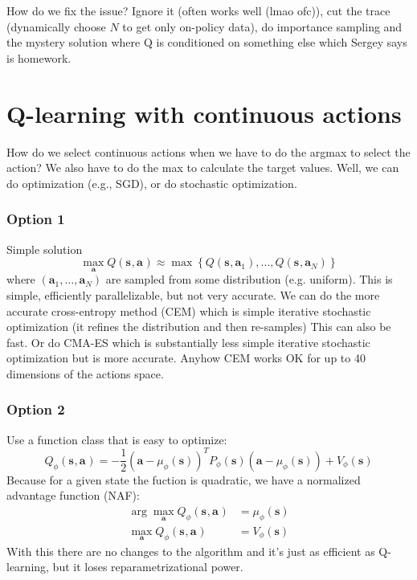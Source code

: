 \documentclass{report}
\newcommand{\argmax}{\arg\!\max}
\begin{document}
How do we fix the issue?
Ignore it (often works well (lmao ofc)), cut the trace (dynamically choose $N$ to get only on-policy data),
do importance sampling and the mystery solution where Q is conditioned on something else which Sergey says is homework.

\section{Q-learning with continuous actions}
How do we select continuous actions when we have to do the argmax to select the action?
We also have to do the max to calculate the target values.
Well, we can do optimization (e.g., SGD), or do stochastic optimization.
\subsubsection{Option 1}
Simple solution
\begin{equation}
		\max_{\bm{a}} Q(\bm{s}_{}, \bm{a}_{}) \approx \max \left\{ Q(\bm{s}_{}, \bm{a}_{1}), \dots,Q(\bm{s}_{}, \bm{a}_{N})  \right\} 
\end{equation}
where $(\bm{a}_1, \dots, \bm{a}_N)$ are sampled from some distribution (e.g. uniform).
This is simple, efficiently parallelizable, but not very accurate.
We can do the more accurate cross-entropy method (CEM) which is simple iterative stochastic optimization (it refines the distribution and then re-samples)
This can also be fast.
Or do CMA-ES which is substantially less simple iterative stochastic optimization but is more accurate.
Anyhow CEM works OK for up to 40 dimensions of the actions space.

\subsubsection{Option 2}
Use a function class that is easy to optimize:
\begin{equation}
		Q_\phi (\bm{s}_{}, \bm{a}_{}) = - \frac{1}{2} (\bm{a} - \mu_\phi(\bm{s}))^T P_\phi (\bm{s}) (\bm{a} - \mu_\phi(\bm{s})) + V_\phi (\bm{s})
\end{equation}
Because for a given state the fuction is quadratic, we have a normalized advantage function (NAF):
\begin{align}
		\argmax_{\bm{a}} Q_\phi (\bm{s}_{}, \bm{a}_{}) &= \mu_\phi(\bm{s}) \\
		\max_{\bm{a}} Q_\phi (\bm{s}_{}, \bm{a}_{}) &= V_\phi(\bm{s})
\end{align}
With this there are no changes to the algorithm and it's just as efficient as Q-learning,
but it loses reparametrizational power.
\end{document}
